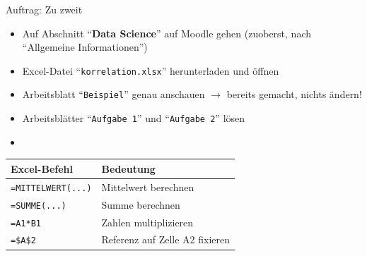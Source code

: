 \begin{frame}[fragile]{Auftrag: Zu zweit}
    \small
    \begin{itemize}
        \item Auf Abschnitt \enquote{\textbf{Data Science}} auf Moodle gehen (zuoberst, nach \enquote{Allgemeine Informationen})
        \item Excel-Datei \enquote{\texttt{korrelation.xlsx}} herunterladen und öffnen
        \item Arbeitsblatt \enquote{\texttt{Beispiel}} genau anschauen $\rightarrow$ bereits gemacht, nichts ändern!
        \item Arbeitsblätter \enquote{\texttt{Aufgabe 1}} und \enquote{\texttt{Aufgabe 2}} lösen
        \item {}
    \end{itemize}

    \begin{table}[H]
        \centering
        \begin{tabular}{ll}
            \textbf{Excel-Befehl}   & \textbf{Bedeutung}             \\\midrule
            \verb|=MITTELWERT(...)| & Mittelwert berechnen           \\
            \verb|=SUMME(...)|      & Summe berechnen                \\
            \verb|=A1*B1|           & Zahlen multiplizieren          \\
            \verb|=$A$2|            & Referenz auf Zelle A2 fixieren \\
        \end{tabular}
    \end{table}
\end{frame}

